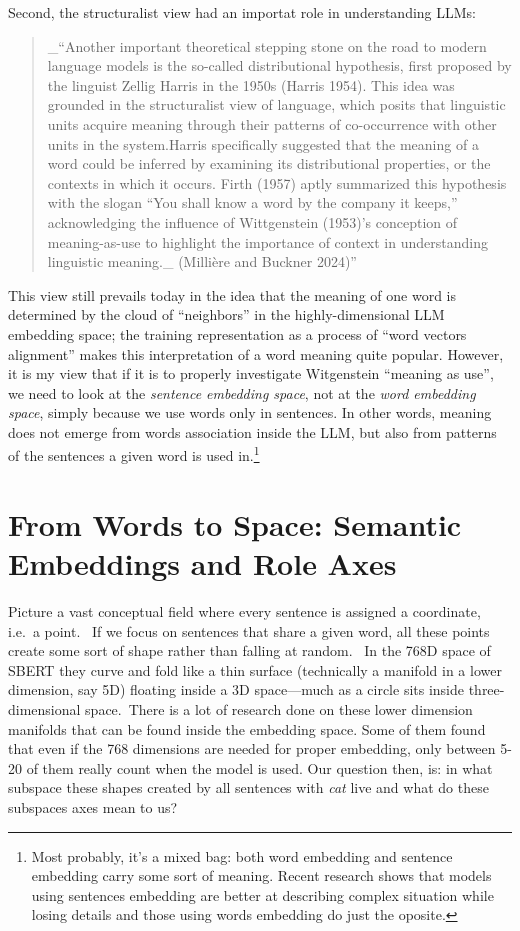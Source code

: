 \documentclass[12pt]{article}
\begin{document}
Second, the structuralist view had an importat role in understanding LLMs:

\begin{quote}
\_``Another important theoretical stepping stone on the road to modern language models is the so-called distributional hypothesis, first proposed by the linguist Zellig Harris in the 1950s (Harris 1954). This idea was grounded in the structuralist view of language, which posits that linguistic units acquire meaning through their patterns of co-occurrence with other units in the system.Harris specifically suggested that the meaning of a word could be inferred by examining its distributional properties, or the contexts in which it occurs. Firth (1957) aptly summarized this hypothesis with the slogan ``You shall know a word by the company it keeps,'' acknowledging the influence of Wittgenstein (1953)'s conception of meaning-as-use to highlight the importance of context in understanding linguistic meaning.\_ (Millière and Buckner 2024)''
\end{quote}

This view still prevails today in the idea that the meaning of one word is determined by the cloud of ``neighbors'' in the highly-dimensional LLM embedding space; the training representation as a process of ``word vectors alignment'' makes this interpretation of a word meaning quite popular. However, it is my view that if it is to properly investigate Witgenstein ``meaning as use'', we need to look at the \emph{sentence embedding space}, not at the \emph{word embedding space}, simply because we use words only in sentences. In other words, meaning does not emerge from words association inside the LLM, but also from patterns of the sentences a given word is used in.\footnote{Most probably, it's a mixed bag: both word embedding and sentence embedding carry some sort of meaning. Recent research shows that models using sentences embedding are better at describing complex situation while losing details and those using words embedding do just the oposite.}

\section{From Words to Space: Semantic Embeddings and Role Axes}\label{from-words-to-space-semantic-embeddings-and-role-axes}

Picture a vast conceptual field where every sentence is assigned a coordinate, i.e.~a point.~ If we focus on sentences that share a given word, all these points create some sort of shape rather than falling at random.~ In the 768D space of SBERT they curve and fold like a thin surface (technically a manifold in a lower dimension, say 5D) floating inside a 3D space---much as a circle sits inside three-dimensional space.~There is a lot of research done on these lower dimension manifolds that can be found inside the embedding space. Some of them found that even if the 768 dimensions are needed for proper embedding, only between 5-20 of them really count when the model is used. Our question then, is: in what subspace these shapes created by all sentences with \emph{cat} live and what do these subspaces axes mean to us?
\end{document}
